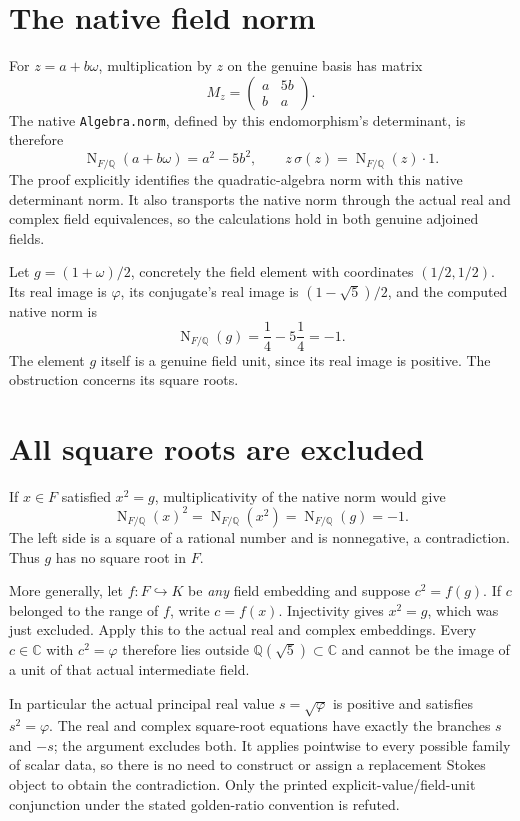 \documentclass[10pt,a4paper]{article}
\newcommand{\Q}{\mathbb Q}
\newcommand{\C}{\mathbb C}
\newcommand{\Nm}{\operatorname{N}}
\begin{document}
\section*{The native field norm}
For $z=a+b\omega$, multiplication by $z$ on the genuine basis has matrix
\[
 M_z=\begin{pmatrix}a&5b\\b&a\end{pmatrix}.
\]
The native \texttt{Algebra.norm}, defined by this endomorphism's
determinant, is therefore
\[
 \Nm_{F/\Q}(a+b\omega)=a^2-5b^2,
 \qquad z\,\sigma(z)=\Nm_{F/\Q}(z)\cdot1.
\]
The proof explicitly identifies the quadratic-algebra norm with this
native determinant norm. It also transports the native norm through
the actual real and complex field equivalences, so the calculations
hold in both genuine adjoined fields.

Let $g=(1+\omega)/2$, concretely the field element with coordinates
$(1/2,1/2)$. Its real image is $\varphi$, its conjugate's real image is
$(1-\sqrt5)/2$, and the computed native norm is
\[
 \Nm_{F/\Q}(g)=\frac14-5\frac14=-1.
\]
The element $g$ itself is a genuine field unit, since its real image is
positive. The obstruction concerns its square roots.

\section*{All square roots are excluded}
If $x\in F$ satisfied $x^2=g$, multiplicativity of the native norm would
give
\[
  \Nm_{F/\Q}(x)^2=\Nm_{F/\Q}(x^2)=\Nm_{F/\Q}(g)=-1.
\]
The left side is a square of a rational number and is nonnegative, a
contradiction. Thus $g$ has no square root in $F$.

More generally, let $f:F\hookrightarrow K$ be \emph{any} field embedding
and suppose $c^2=f(g)$. If $c$ belonged to the range of $f$, write
$c=f(x)$. Injectivity gives $x^2=g$, which was just excluded. Apply this
to the actual real and complex embeddings. Every $c\in\C$ with
$c^2=\varphi$ therefore lies outside $\Q(\sqrt5)\subset\C$ and cannot
be the image of a unit of that actual intermediate field.

In particular the actual principal real value $s=\sqrt\varphi$ is positive
and satisfies $s^2=\varphi$. The real and complex square-root equations
have exactly the branches $s$ and $-s$; the argument excludes both.
It applies pointwise to every possible family of scalar data, so there
is no need to construct or assign a replacement Stokes object to obtain
the contradiction. Only the printed explicit-value/field-unit conjunction
under the stated golden-ratio convention is refuted.
\end{document}
